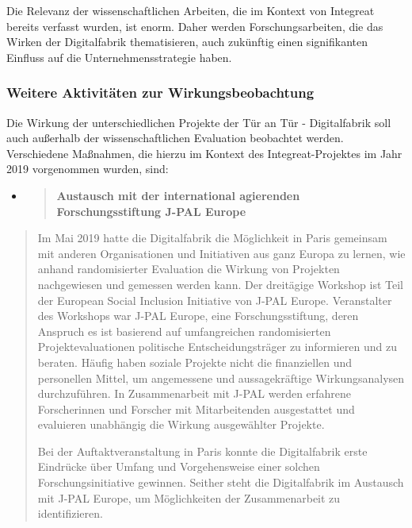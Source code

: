 \documentclass[12pt, a4paper]{article} %
\begin{document}
Die Relevanz der wissenschaftlichen Arbeiten, die im Kontext von
Integreat bereits verfasst wurden, ist enorm. Daher werden
Forschungsarbeiten, die das Wirken der Digitalfabrik thematisieren, auch
zukünftig einen signifikanten Einfluss auf die Unternehmensstrategie
haben.

\hypertarget{weitere-aktivituxe4ten-zur-wirkungsbeobachtung}{%
\subsubsection{Weitere Aktivitäten zur
Wirkungsbeobachtung}\label{weitere-aktivituxe4ten-zur-wirkungsbeobachtung}}

Die Wirkung der unterschiedlichen Projekte der Tür an Tür -
Digitalfabrik soll auch außerhalb der wissenschaftlichen Evaluation
beobachtet werden. Verschiedene Maßnahmen, die hierzu im Kontext des
Integreat-Projektes im Jahr 2019 vorgenommen wurden, sind:

\begin{itemize}
\item
  \begin{quote}
  \textbf{Austausch mit der international agierenden Forschungsstiftung
  J-PAL Europe}
  \end{quote}
\end{itemize}

\begin{quote}
Im Mai 2019 hatte die Digitalfabrik die Möglichkeit in Paris gemeinsam
mit anderen Organisationen und Initiativen aus ganz Europa zu lernen,
wie anhand randomisierter Evaluation die Wirkung von Projekten
nachgewiesen und gemessen werden kann. Der dreitägige Workshop ist Teil
der European Social Inclusion Initiative von J-PAL Europe. Veranstalter
des Workshops war J-PAL Europe, eine Forschungsstiftung, deren Anspruch
es ist basierend auf umfangreichen randomisierten Projektevaluationen
politische Entscheidungsträger zu informieren und zu beraten. Häufig
haben soziale Projekte nicht die finanziellen und personellen Mittel, um
angemessene und aussagekräftige Wirkungsanalysen durchzuführen. In
Zusammenarbeit mit J-PAL werden erfahrene Forscherinnen und Forscher mit
Mitarbeitenden ausgestattet und evaluieren unabhängig die Wirkung
ausgewählter Projekte.

Bei der Auftaktveranstaltung in Paris konnte die Digitalfabrik erste
Eindrücke über Umfang und Vorgehensweise einer solchen
Forschungsinitiative gewinnen. Seither steht die Digitalfabrik im
Austausch mit J-PAL Europe, um Möglichkeiten der Zusammenarbeit zu
identifizieren.
\end{quote}
\end{document}
